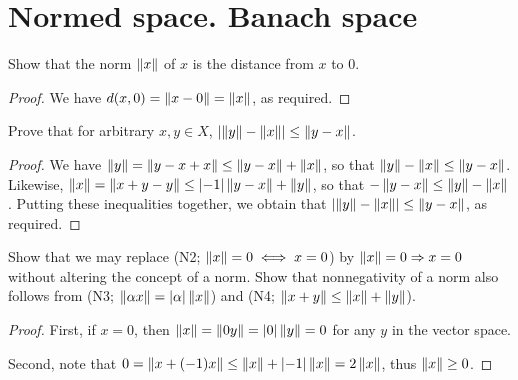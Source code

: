 \section{Normed space. Banach space}


\begin{exercise}{1}
Show that the norm $\norm{x}$ of $x$ is the distance from $x$ to 0.
\end{exercise}
\begin{proof}
We have $d(x,0)=\norm{x-0}=\norm{x}$, as required.
\end{proof}

\begin{exercise}{3}
Prove that for arbitrary $x,y\in X$, $\absoluteValue{\norm{y}-\norm{x}}\leq \norm{y-x}$.
\end{exercise}
\begin{proof}
We have $\norm{y} =\norm{y-x+x} \leq\norm{y-x}+\norm{x}$, so that $\norm{y}-\norm{x}\leq\norm{y-x}$. Likewise, $\norm{x} =\norm{x+y-y} \leq\absoluteValue{-1}\norm{y-x}+\norm{y}$, so that $-\norm{y-x}\leq\norm{y}-\norm{x}$. Putting these inequalities together, we obtain that $\absoluteValue{\norm{y}-\norm{x}}\leq\norm{y-x}$, as required.
\end{proof}

\begin{exercise}{4}
Show that we may replace (N2; $\norm{x}=0\iff x=0$) by $\norm{x}=0\Rightarrow x=0$ without altering the concept of a norm. Show that nonnegativity of a norm also follows from (N3; $\norm{\alpha x}=\absoluteValue{\alpha}\norm{x}$) and (N4; $\norm{x+y}\leq \norm{x}+\norm{y}$).
\end{exercise}
\begin{proof}
First, if $x=0$, then $\norm{x} =\norm{0y} =\absoluteValue{0}\norm{y} =0$ for any $y$ in the vector space.

Second, note that $0=\norm{x+(-1)x}\leq \norm{x}+\absoluteValue{-1}\norm{x} =2\norm{x}$, thus $\norm{x}\geq 0$.
\end{proof}

